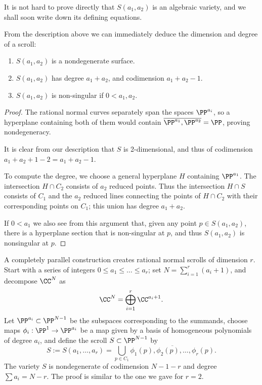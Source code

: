 It is not hard to prove directly that $S(a_1,a_2)$ is an algebraic variety, and we shall soon write down its defining equations.



From the description above we can immediately deduce the dimension and degree of a scroll:

\begin{proposition}
\begin{enumerate}
\item $S(a_1,a_2)$ is a nondegenerate surface.
 \item $S(a_1,a_2)$ has degree $a_1+a_2$, and codimension $a_1+a_2-1.$
 \item $S(a_{1},a_{2})$ is non-singular if $0<a_{1}, a_{2}$.
 \end{enumerate}
\end{proposition}\label{deg and codim}

\begin{proof}
 The rational normal curves separately span the spaces $\PP^{a_i}$, so a hyperplane containing both of them would contain $\overline{\PP^{a_1}, \PP^{a_{2}}} = \PP$, proving nondegeneracy. 
 
 It is clear from our description that $S$ is 2-dimensional, and thus of
codimension $a_{1}+a_{2}+1 -2 = a_{1}+a_{2}-1$. 

To compute the degree, we choose a general hyperplane $H$ containing $\PP^{a_{1}}$. The intersection $H\cap C_{2}$ consists of $a_{2}$ reduced points. Thus the intersection $H\cap S$ consists of $C_{1}$ and the $a_{2}$ reduced lines connecting 
the points of $H\cap C_{2}$ with their corresponding points on $C_{1}$; this union has degree $a_{1}+a_{2}$.

If $0< a_{1}$ we also see from this argument that, given any point  $p\in S(a_{1},a_{2})$, there is
a hyperplane section that is non-singular at $p$, and thus $S(a_{1},a_{2})$ is nonsingular at $p$.
\end{proof}

A completely parallel construction creates rational normal scrolls of dimension $r$. Start with a series of integers $0 \leq a_1 \leq \dots \leq a_r$;
set $N = \sum_{i=1}^{r}(a_{i}+1)$,  and
decompose $\CC^{N}$ as
$$
\CC^{N} = \bigoplus_{i=1}^{r}\CC^{a_{i}+1}.
$$
Let $\PP^{a_{i}}\subset \PP^{N-1}$ be the subspaces corresponding to the summands,  choose
maps $\phi_i : \PP^1 \to \PP^{a_{i}}$ be a map given by a basis of homogeneous polynomials of degree $a_i$, and define the scroll $S \subset \PP^{N-1}$ by
$$
S:=S(a_{1}, \dots, a_{r}) = \bigcup_{p\in C_{1}}\overline{\phi_1(p), \phi_{2}(p), \dots, \phi_{r}(p)}.
$$
The variety $S$ is nondegenerate of codimension $N-1-r$ and degree $\sum a_{i} = N-r$. The proof is similar to the one we gave for $r=2$.

